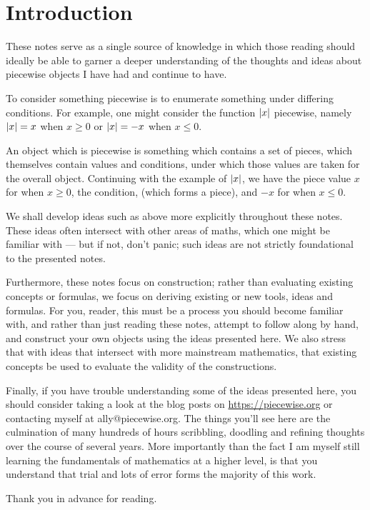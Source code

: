 \section{Introduction}
These notes serve as a single source of knowledge in which those reading should ideally be able to garner a deeper understanding of the thoughts and ideas about piecewise objects I have had and continue to have.

To consider something piecewise is to enumerate something under differing conditions. For example, one might consider the function $\abs{x}$ piecewise, namely $\abs{x}=x$ when $x\geq 0$ or $\abs{x}=-x$ when $x\leq 0$.

An object which is piecewise is something which contains a set of pieces, which themselves contain values and conditions, under which those values are taken for the overall object. Continuing with the example of $\abs{x}$, we have the piece value $x$ for when $x\geq 0$, the condition, (which forms a piece), and $-x$ for when $x\leq 0$.

We shall develop ideas such as above more explicitly throughout these notes. These ideas often intersect with other areas of maths, which one might be familiar with --- but if not, don't panic; such ideas are not strictly foundational to the presented notes. 

Furthermore, these notes focus on construction; rather than evaluating existing concepts or formulas, we focus on deriving existing or new tools, ideas and formulas. For you, reader, this must be a process you should become familiar with, and rather than just reading these notes, attempt to follow along by hand, and construct your own objects using the ideas presented here. We also stress that with ideas that intersect with more mainstream mathematics, that existing concepts be used to evaluate the validity of the constructions.

Finally, if you have trouble understanding some of the ideas presented here, you should consider taking a look at the blog posts on \url{https://piecewise.org} or contacting myself at ally@piecewise.org. The things you'll see here are the culmination of many hundreds of hours scribbling, doodling and refining thoughts over the course of several years. More importantly than the fact I am myself still learning the fundamentals of mathematics at a higher level, is that you understand that trial and lots of error forms the majority of this work.

Thank you in advance for reading.

\newpage